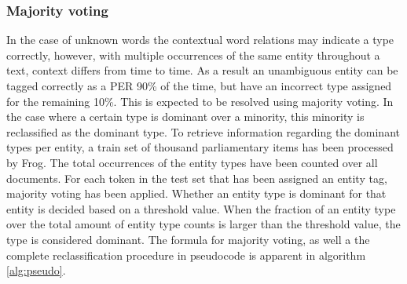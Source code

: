 \subsubsection{Majority voting}
In the case of unknown words the contextual word relations may indicate a type correctly, however, with multiple occurrences of the same entity throughout a text, context differs from time to time. As a result an unambiguous entity can be tagged correctly as a PER 90\% of the time, but have an incorrect type assigned for the remaining 10\%. This is expected to be resolved using majority voting. In the case where a certain type is dominant over a minority, this minority is reclassified as the dominant type. To retrieve information regarding the dominant types per entity, a train set of thousand parliamentary items has been processed by Frog. The total occurrences of the entity types have been counted over all documents. For each token in the test set that has been assigned an entity tag, majority voting has been applied. Whether an entity type is dominant for that entity is decided based on a threshold value. When the fraction of an entity type over the total amount of entity type counts is larger than the threshold value, the type is considered dominant. The formula for majority voting, as well a the complete reclassification procedure in pseudocode is apparent in algorithm \ref{alg:pseudo}.

